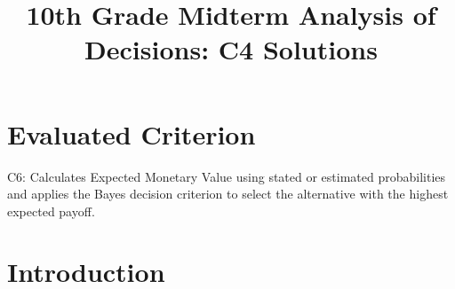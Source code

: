 \makeatletter
{}
\makeatother

%





\title{10th Grade Midterm Analysis of Decisions: C4 Solutions}
\author{}
\date{}

\pagestyle{empty}


	
	\maketitle
	\setcounter{tocdepth}{1}
	\setcounter{secnumdepth}{2}
	\label{toc}
	\vspace*{-20mm}
	\tableofcontents
	
	
	\section*{Evaluated Criterion}
	
	C6: Calculates Expected Monetary Value using stated or estimated probabilities and applies the Bayes decision criterion to select the alternative with the highest expected payoff.
	
	
	\section{Introduction}\label{sec:c4-introduction}
\label{tone:legend}

	\vspace{8mm}
	
